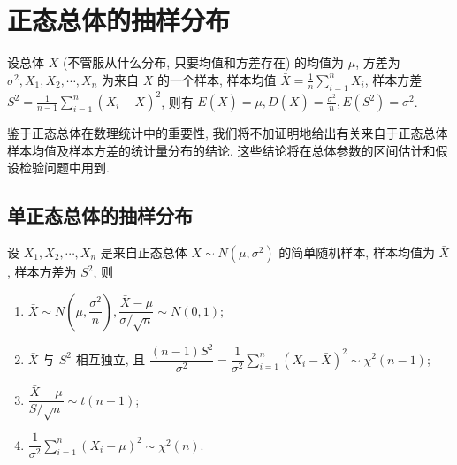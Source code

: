 \section{正态总体的抽样分布}

设总体 $ X $ (不管服从什么分布, 只要均值和方差存在) 的均值为 $ \mu $, 方差为 $ \sigma^{2}, X_{1}, X_{2}, \cdots ,  X_{n} $ 为来自 $ X $ 的一个样本, 样本均值 $\displaystyle \bar{X}=\frac{1}{n} \sum_{i=1}^{n} X_{i} $, 样本方差 $\displaystyle S^{2}=\frac{1}{n-1} \sum_{i=1}^{n}\left(X_{i}-\bar{X}\right)^{2} $, 则有 $\displaystyle E(\bar{X})=\mu, D(\bar{X})=\frac{\sigma^{2}}{n}, E\left(S^{2}\right)=\sigma^{2} $.

鉴于正态总体在数理统计中的重要性, 我们将不加证明地给出有关来自于正态总体样本均值及样本方差的统计量分布的结论. 这些结论将在总体参数的区间估计和假设检验问题中用到.

\subsection{单正态总体的抽样分布}

\begin{theorem}[单正态总体的抽样分布]
    设 $ X_{1}, X_{2}, \cdots, X_{n} $ 是来自正态总体 $ X \sim N\left(\mu, \sigma^{2}\right) $ 的简单随机样本, 样本均值为 $ \bar{X} $, 样本方差为 $ S^{2}$, 则
    \begin{enumerate}[label=(\arabic{*})]
        \item $\bar{X} \sim N\left(\mu, \dfrac{\sigma^{2}}{n}\right), \dfrac{\bar{X}-\mu}{\sigma / \sqrt{n}} \sim N(0,1) $;
        \item $\bar{X} $ 与 $ S^{2} $ 相互独立, 且
              $\displaystyle \dfrac{(n-1) S^{2}}{\sigma^{2}}=\dfrac{1}{\sigma^{2}} \sum_{i=1}^{n}\left(X_{i}-\bar{X}\right)^{2} \sim \chi^{2}(n-1)$;
        \item $\displaystyle \dfrac{\bar{X}-\mu}{S / \sqrt{n}} \sim t(n-1) $;
        \item $\displaystyle \dfrac{1}{\sigma^{2}} \sum_{i=1}^{n}\left(X_{i}-\mu\right)^{2} \sim \chi^{2}(n) .$
    \end{enumerate}
\end{theorem}

